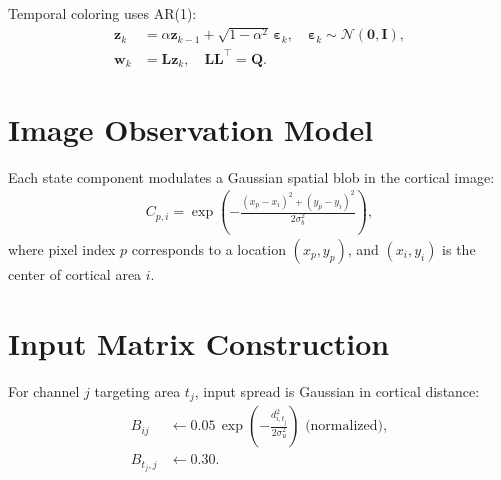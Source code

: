 \documentclass[11pt]{article}
\begin{document}
Temporal coloring uses AR(1):
\begin{align}
\mathbf{z}_k &= \alpha\mathbf{z}_{k-1} + \sqrt{1-\alpha^2}\,\boldsymbol{\varepsilon}_k,
\quad \boldsymbol{\varepsilon}_k\sim\mathcal{N}(\mathbf{0},\mathbf{I}), \\
\mathbf{w}_k &= \mathbf{L}\mathbf{z}_k,
\quad \mathbf{L}\mathbf{L}^\top = \mathbf{Q}.
\end{align}

\section*{Image Observation Model}
Each state component modulates a Gaussian spatial blob in the cortical image:
\begin{align}
C_{p,i} = \exp\!\left(-\frac{(x_p-x_i)^2+(y_p-y_i)^2}{2\sigma_b^2}\right),
\end{align}
where pixel index \(p\) corresponds to a location \((x_p,y_p)\), and \((x_i,y_i)\) is the center of cortical area \(i\).

\section*{Input Matrix Construction}
For channel \(j\) targeting area \(t_j\), input spread is Gaussian in cortical distance:
\begin{align}
B_{ij} &\leftarrow 0.05\,\exp\!\left(-\frac{d_{i,t_j}^2}{2\sigma_u^2}\right) \text{ (normalized)}, \\
B_{t_j,j} &\leftarrow 0.30.
\end{align}
\end{document}
